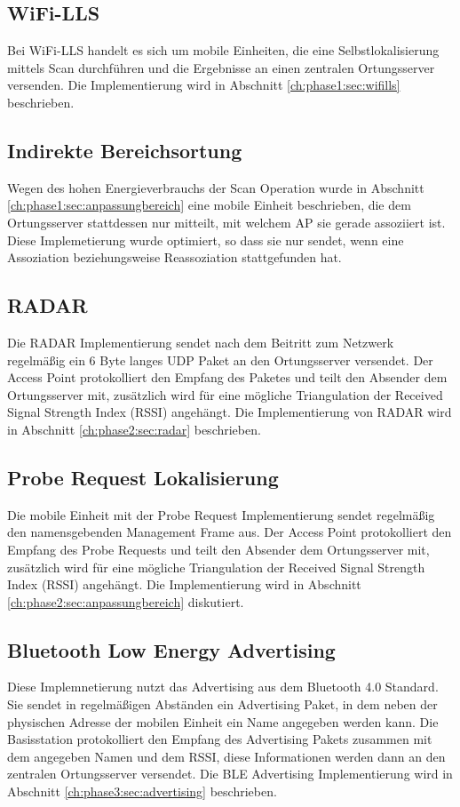 \subsection{WiFi-LLS}
\label{ch:realworld:sec:wifills}
Bei WiFi-LLS handelt es sich um mobile Einheiten, die eine Selbstlokalisierung mittels Scan durchführen und die Ergebnisse an einen zentralen Ortungsserver versenden.
Die Implementierung wird in Abschnitt \ref{ch:phase1:sec:wifills} beschrieben.

\subsection{Indirekte Bereichsortung}
\label{ch:realworld:sec:indirekt}
Wegen des hohen Energieverbrauchs der Scan Operation wurde in Abschnitt \ref{ch:phase1:sec:anpassungbereich} eine mobile Einheit beschrieben, die dem Ortungsserver stattdessen nur mitteilt, mit welchem AP sie gerade assoziiert ist. 
Diese Implemetierung wurde optimiert, so dass sie nur sendet, wenn eine Assoziation beziehungsweise Reassoziation stattgefunden hat.

\subsection{RADAR}
Die RADAR Implementierung sendet nach dem Beitritt zum Netzwerk regelmäßig ein 6 Byte langes UDP Paket an den Ortungsserver versendet.
Der Access Point protokolliert den Empfang des Paketes und teilt den Absender dem Ortungsserver mit, zusätzlich wird für eine mögliche Triangulation der Received Signal Strength Index (RSSI) angehängt.
Die Implementierung von RADAR wird in Abschnitt \ref{ch:phase2:sec:radar} beschrieben.

\subsection{Probe Request Lokalisierung}
Die mobile Einheit mit der Probe Request Implementierung sendet regelmäßig den namensgebenden Management Frame aus.
Der Access Point protokolliert den Empfang des Probe Requests und teilt den Absender dem Ortungsserver mit, zusätzlich wird für eine mögliche Triangulation der Received Signal Strength Index (RSSI) angehängt.
Die Implementierung wird in Abschnitt \ref{ch:phase2:sec:anpassungbereich} diskutiert.

\subsection{Bluetooth Low Energy Advertising}
\label{ch:realworld:sec:ble}
Diese Implemnetierung nutzt das Advertising aus dem Bluetooth 4.0 Standard.
Sie sendet in regelmäßigen Abständen ein Advertising Paket, in dem neben der physischen Adresse der mobilen Einheit ein Name angegeben werden kann.
Die Basisstation protokolliert den Empfang des Advertising Pakets zusammen mit dem angegeben Namen und dem RSSI, diese Informationen werden dann an den zentralen Ortungsserver versendet.
Die BLE Advertising Implementierung wird in Abschnitt \ref{ch:phase3:sec:advertising} beschrieben.

